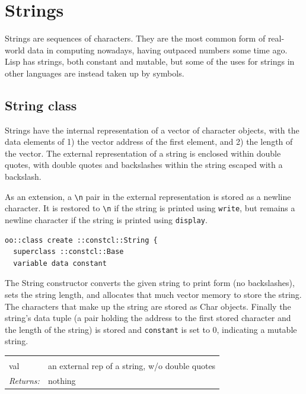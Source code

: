 \documentclass[twoside]{report}
\begin{document}
\section{Strings}
\label{strings}

Strings are sequences of characters. They are the most common form of real-world data in computing nowadays, having outpaced numbers some time ago. Lisp has strings, both constant and mutable, but some of the uses for strings in other languages are instead taken up by symbols.

\subsection{String class}
\label{string-class}

Strings have the internal representation of a vector of character objects, with the data elements of 1) the vector address of the first element, and 2) the length of the vector. The external representation of a string is enclosed within double quotes, with double quotes and backslashes within the string escaped with a backslash.

As an extension, a \texttt{\textbackslash n} pair in the external representation is stored as a newline character. It is restored to \texttt{\textbackslash n} if the string is printed using \texttt{write}, but remains a newline character if the string is printed using \texttt{display}.

\begin{lstlisting}
oo::class create ::constcl::String {
  superclass ::constcl::Base
  variable data constant
\end{lstlisting}

The String constructor converts the given string to print form (no backslashes), sets the string length, and allocates that much vector memory to store the string. The characters that make up the string are stored as Char objects. Finally the string's data tuple (a pair holding the address to the first stored character and the length of the string) is stored and \texttt{constant} is set to 0, indicating a mutable string.

\noindent\begin{tabular}{ |p{1.9cm} p{8cm}| }
\hline
\rowcolor[HTML]{CCCCCC} \multicolumn{2}{|l|}{\bf String constructor (internal)} \\
val & an external rep of a string, w/o double quotes \\
\textit{Returns:} & nothing \\
\hline
\end{tabular}
\end{document}
